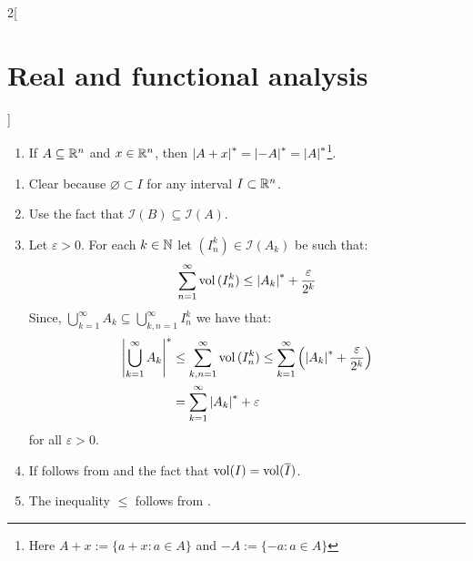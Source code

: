 \documentclass[../../../main_math.tex]{subfiles}
\begin{document}
\begin{multicols}{2}[\section{Real and functional analysis}]
\begin{theorem}
\begin{enumerate}
            \item\label{RFA:measureG} If $A\subseteq\mathbb{R}^n$ and $x\in\mathbb{R}^n$, then $\om{A+x}=\om{-A}=\om{A}$\footnote{Here $A+x:=\{a+x:a\in A\}$ and $-A:=\{-a:a\in A\}$}.
    \end{enumerate}
  \end{theorem}
  \begin{sproof}
    \begin{enumerate}
      \item Clear because $\varnothing\subset I$ for any interval $I\subset\mathbb{R}^n$.
      \item Use the fact that $\mathcal{I}(B)\subseteq\mathcal{I}(A)$.
      \item Let $\varepsilon>0$. For each $k\in\mathbb{N}$ let $(I_n^k)\in\mathcal{I}(A_k)$ be such that: $$\sum_{n=1}^\infty\vol{(I_n^k)}\leq\om{A_k}+\frac{\varepsilon}{2^k}$$
            Since, $\bigcup_{k=1}^\infty A_k\subseteq \bigcup_{k,n=1}^\infty I_n^k$ we have that:
            \begin{align*}
              \om{\bigcup_{k=1}^\infty A_k} & \leq \sum_{k,n=1}^\infty\vol{(I_n^k)}\leq\sum_{k= 1}^\infty\left(\om{A_k}+\frac{\varepsilon}{2^k}\right) \\
                                            & =\sum_{k=1}^\infty \om{A_k}+\varepsilon
            \end{align*}
            for all $\varepsilon>0$.
      \item If follows from  and the fact that $\operatorname{vol}(I)=\operatorname{vol}(\overline{I})$.
      \item The inequality $\leq$ follows from .


\end{enumerate}
\end{sproof}
\end{multicols}
\end{document}
